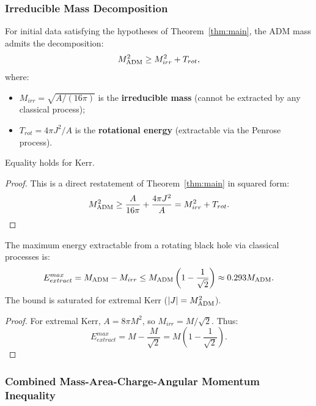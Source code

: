 \subsubsection{Irreducible Mass Decomposition}

\begin{theorem}\label{thm:mass-decomposition}
For initial data satisfying the hypotheses of Theorem~\ref{thm:main}, the ADM mass admits the decomposition:
\begin{equation}
    M_{\mathrm{ADM}}^2 \geq M_{irr}^2 + T_{rot},
\end{equation}
where:
\begin{itemize}
    \item $M_{irr} = \sqrt{A/(16\pi)}$ is the \textbf{irreducible mass} (cannot be extracted by any classical process);
    \item $T_{rot} = 4\pi J^2/A$ is the \textbf{rotational energy} (extractable via the Penrose process).
\end{itemize}
Equality holds for Kerr.
\end{theorem}

\begin{proof}
This is a direct restatement of Theorem~\ref{thm:main} in squared form:
\[
M_{\mathrm{ADM}}^2 \geq \frac{A}{16\pi} + \frac{4\pi J^2}{A} = M_{irr}^2 + T_{rot}.
\]
\end{proof}

\begin{corollary}\label{cor:extractable-energy}
The maximum energy extractable from a rotating black hole via classical processes is:
\begin{equation}
    E_{extract}^{max} = M_{\mathrm{ADM}} - M_{irr} \leq M_{\mathrm{ADM}}\left(1 - \frac{1}{\sqrt{2}}\right) \approx 0.293 M_{\mathrm{ADM}}.
\end{equation}
The bound is saturated for extremal Kerr ($|J| = M_{\mathrm{ADM}}^2$).
\end{corollary}

\begin{proof}
For extremal Kerr, $A = 8\pi M^2$, so $M_{irr} = M/\sqrt{2}$. Thus:
\[
E_{extract}^{max} = M - \frac{M}{\sqrt{2}} = M\left(1 - \frac{1}{\sqrt{2}}\right).
\]
\end{proof}

\subsubsection{Combined Mass-Area-Charge-Angular Momentum Inequality}

